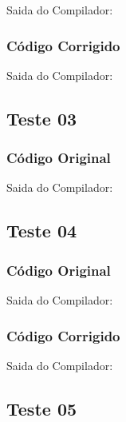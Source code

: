 Saida do Compilador:




\subsubsection{Código Corrigido}


Saida do Compilador:




\subsection{Teste 03}
\label{subsec:sintaticoTeste03}

\subsubsection{Código Original}


Saida do Compilador:




\subsection{Teste 04}
\label{subsec:sintaticoTeste04}

\subsubsection{Código Original}


Saida do Compilador:




\subsubsection{Código Corrigido}


Saida do Compilador:




\subsection{Teste 05}
\label{subsec:sintaticoTeste05}

